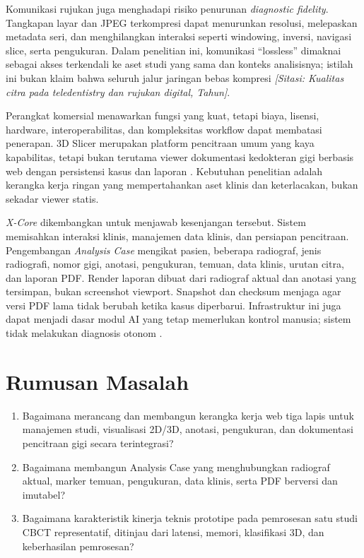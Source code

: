 \documentclass[12pt,a4paper,oneside]{report}
\newcommand{\sitasi}[1]{\textit{[Sitasi: #1]}}
\newcommand{\xcore}{\textit{X-Core}}
\begin{document}
Komunikasi rujukan juga menghadapi risiko penurunan \textit{diagnostic fidelity}. Tangkapan layar dan JPEG terkompresi dapat menurunkan resolusi, melepaskan metadata seri, dan menghilangkan interaksi seperti windowing, inversi, navigasi slice, serta pengukuran. Dalam penelitian ini, komunikasi ``lossless'' dimaknai sebagai akses terkendali ke aset studi yang sama dan konteks analisisnya; istilah ini bukan klaim bahwa seluruh jalur jaringan bebas kompresi \sitasi{Kualitas citra pada teledentistry dan rujukan digital, Tahun}.

Perangkat komersial menawarkan fungsi yang kuat, tetapi biaya, lisensi, hardware, interoperabilitas, dan kompleksitas workflow dapat membatasi penerapan. 3D Slicer merupakan platform pencitraan umum yang kaya kapabilitas, tetapi bukan terutama viewer dokumentasi kedokteran gigi berbasis web dengan persistensi kasus dan laporan \cite{ref:fedorov2012}. Kebutuhan penelitian adalah kerangka kerja ringan yang mempertahankan aset klinis dan keterlacakan, bukan sekadar viewer statis.

\xcore{} dikembangkan untuk menjawab kesenjangan tersebut. Sistem memisahkan interaksi klinis, manajemen data klinis, dan persiapan pencitraan. Pengembangan \textit{Analysis Case} mengikat pasien, beberapa radiograf, jenis radiografi, nomor gigi, anotasi, pengukuran, temuan, data klinis, urutan citra, dan laporan PDF. Render laporan dibuat dari radiograf aktual dan anotasi yang tersimpan, bukan screenshot viewport. Snapshot dan checksum menjaga agar versi PDF lama tidak berubah ketika kasus diperbarui. Infrastruktur ini juga dapat menjadi dasar modul AI yang tetap memerlukan kontrol manusia; sistem tidak melakukan diagnosis otonom \cite{ref:katsumata2023,ref:ding2023}.

\section{Rumusan Masalah}
\begin{enumerate}[label=\arabic*.]
\item Bagaimana merancang dan membangun kerangka kerja web tiga lapis untuk manajemen studi, visualisasi 2D/3D, anotasi, pengukuran, dan dokumentasi pencitraan gigi secara terintegrasi?
\item Bagaimana membangun Analysis Case yang menghubungkan radiograf aktual, marker temuan, pengukuran, data klinis, serta PDF berversi dan imutabel?
\item Bagaimana karakteristik kinerja teknis prototipe pada pemrosesan satu studi CBCT representatif, ditinjau dari latensi, memori, klasifikasi 3D, dan keberhasilan pemrosesan?
\end{enumerate}
\end{document}
